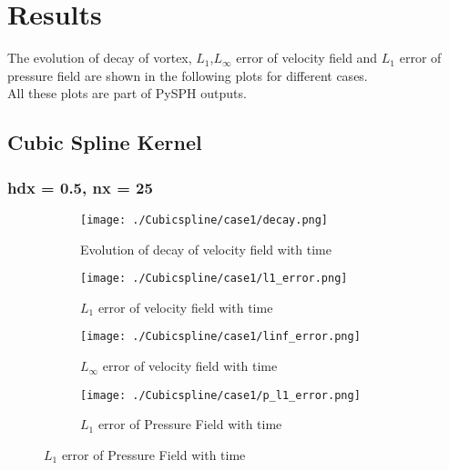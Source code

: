\documentclass[11pt, a4paper]{article}
\begin{document}
\section{Results}
The evolution of decay of vortex, $L_1$,$L_\infty$ error of velocity field and $L_1$ error of pressure field are shown in the following plots for different cases. \\
All these plots are part of PySPH outputs.
\subsection{Cubic Spline Kernel}
\subsubsection{hdx = 0.5, nx = 25}
\begin{figure}[H]
\begin{subfigure}{0.48\textwidth}
\texttt{[image: ./Cubicspline/case1/decay.png]}
\caption{Evolution of decay of velocity field with time}
\end{subfigure}
\begin{subfigure}{0.48\textwidth}
\texttt{[image: ./Cubicspline/case1/l1\_error.png]}
\caption{$L_1$ error of velocity field with time}
\end{subfigure}
\medskip
\begin{subfigure}{0.48\textwidth}
\texttt{[image: ./Cubicspline/case1/linf\_error.png]}
\caption{$L_\infty$ error of velocity field with time}
\end{subfigure}
\begin{subfigure}{0.48\textwidth}
\texttt{[image: ./Cubicspline/case1/p\_l1\_error.png]}
\caption{$L_1$ error of Pressure Field with time}
\end{subfigure}
\end{figure}
\end{document}
